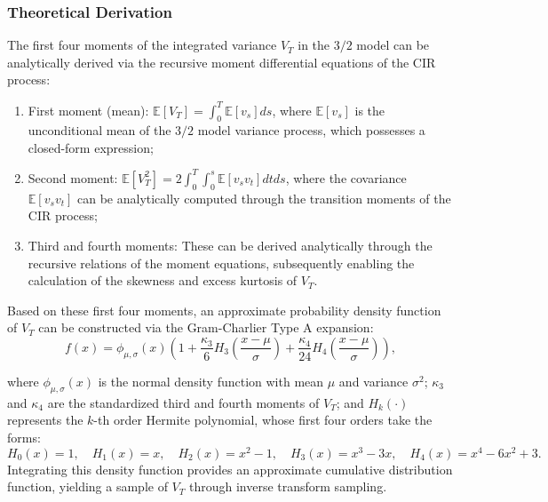 \subsubsection{Theoretical Derivation}
The first four moments of the integrated variance $V_T$ in the $3/2$ model can be analytically derived via the recursive moment differential equations of the CIR process:
\begin{enumerate}
    \item First moment (mean): 
    $\mathbb{E}[V_T] = \int_0^T \mathbb{E}[v_s] ds$,
    where $\mathbb{E}[v_s]$ is the unconditional mean of the $3/2$ model variance process, which possesses a closed-form expression;

    \item Second moment: 
    $\mathbb{E}[V_T^2] = 2 \int_0^T \int_0^s \mathbb{E}[v_s v_t] dtds$,
    where the covariance $\mathbb{E}[v_s v_t]$ can be analytically computed through the transition moments of the CIR process;

    \item Third and fourth moments: 
    These can be derived analytically through the recursive relations of the moment equations, subsequently enabling the calculation of the skewness and excess kurtosis of $V_T$.
\end{enumerate}
Based on these first four moments, an approximate probability density function of $V_T$ can be constructed via the Gram-Charlier Type A expansion:
\begin{equation}
  f(x) = \phi_{\mu,\sigma}(x) \left( 1 + \frac{\kappa_3}{6} H_3\left( \frac{x-\mu}{\sigma} \right) + \frac{\kappa_4}{24} H_4\left( \frac{x-\mu}{\sigma} \right) \right),
\end{equation}

where $\phi_{\mu,\sigma}(x)$ is the normal density function with mean $\mu$ and variance $\sigma^2$; $\kappa_3$ and $\kappa_4$ are the standardized third and fourth moments of $V_T$; and $H_k(\cdot)$ represents the $k$-th order Hermite polynomial, whose first four orders take the forms:
\begin{equation}
  H_0(x) = 1, \quad H_1(x) = x, \quad H_2(x) = x^2 - 1, \quad H_3(x) = x^3 - 3x, \quad H_4(x) = x^4 - 6x^2 + 3.
\end{equation}
Integrating this density function provides an approximate cumulative distribution function, yielding a sample of $V_T$ through inverse transform sampling.

